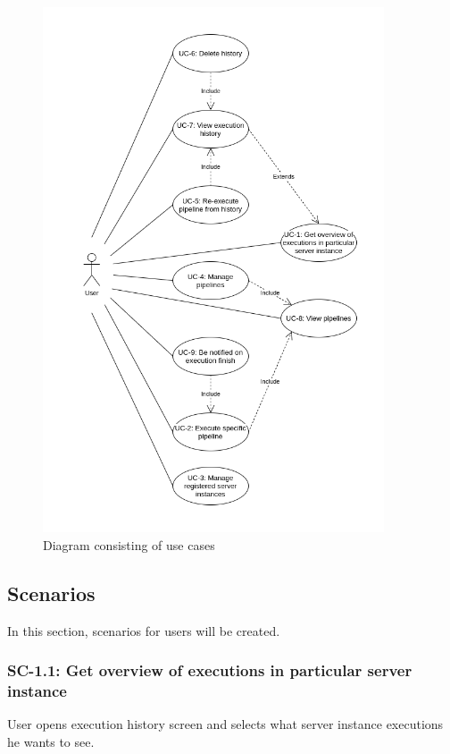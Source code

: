 \begin{figure}\centering
	\includegraphics[width=0.9\textwidth]{pics/bc-uc.png}
	\caption[Use cases]{Diagram consisting of use cases}\label{fig:uc}
\end{figure}


\subsection{Scenarios}
In this section, scenarios for users will be created.

\subsubsection*{SC-1.1: Get overview of executions in particular server instance}
User opens execution history screen and selects what server instance executions he wants to see.
